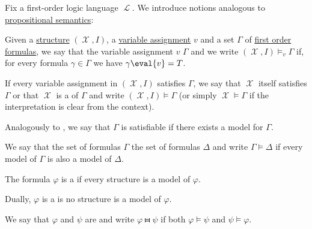 \begin{definition}\label{def:first_order_semantics}\mcite\cite[208]{OpenLogic20201202}
  Fix a first-order logic language \( \mscrL \). We introduce notions analogous to \hyperref[def:propositional_semantics]{propositional semantics}:
  \begin{defenum}
     Given a \hyperref[def:first_order_structure]{structure} \( (\mscrX, I) \), a \hyperref[def:first_order_valuation/variable_assignment]{variable assignment} \( v \) and a set \( \Gamma \) of \hyperref[def:first_order_syntax/formula]{first order formulas}, we say that the variable assignment \( v \)  \( \Gamma \) and we write \( (\mscrX, I) \vDash_v \Gamma \) if, for every formula \( \gamma \in \Gamma \) we have \( \gamma\eval{v} = T \).

    If every variable assignment in \( (\mscrX, I) \) satisfies \( \Gamma \), we say that \( \mscrX \) itself satisfies \( \Gamma \) or that \( \mscrX \) is a  of \( \Gamma \) and write \( (\mscrX, I) \vDash \Gamma \) (or simply \( \mscrX \vDash \Gamma \) if the interpretation is clear from the context).

    Analogously to , we say that \( \Gamma \) is satisfiable if there exists a model for \( \Gamma \).

     We say that the set of formulas \( \Gamma \)  the set of formulas \( \Delta \) and write \( \Gamma \vDash \Delta \) if every model of \( \Gamma \) is also a model of \( \Delta \).

     The formula \( \varphi \) is a  if every structure is a model of \( \varphi \).

     Dually, \( \varphi \) is a  is no structure is a model of \( \varphi \).

     We say that \( \varphi \) and \( \psi \) are  and write \( \varphi \gleichstark \psi \) if both \( \varphi \vDash \psi \) and \( \psi \vDash \varphi \).
  \end{defenum}
\end{definition}

